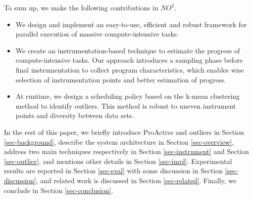 To sum up, we make the following contributions in $NO^2$.
\begin{itemize}
\item We design and implement an easy-to-use, efficient and robust framework for parallel execution of massive compute-intensive tasks.
\item We create an instrumentation-based technique to estimate the progress of compute-intensive tasks. Our approach introduces a sampling phase before final instrumentation to collect program characteristics, which enables wise selection of instrumentation points and better estimation of progress.
\item At runtime, we design a scheduling policy based on the k-mean clustering method to identify outliers. This method is robust to uneven instrument points and diversity between data sets.
\end{itemize}

In the rest of this paper, we briefly introduce ProActive and outliers in Section \ref{sec-background}, describe the system architecture in Section \ref{sec-overview}, address two main techniques respectively in Section \ref{sec-instrument} and Section \ref{sec-outlier}, and mentions other details in Section \ref{sec-impl}. Experimental results are reported in Section \ref{sec-eval} with some discussion in Section \ref{sec-discussion}, and related work is discussed in Section \ref{sec-related}. Finally, we conclude in Section \ref{sec-conclusion}.

